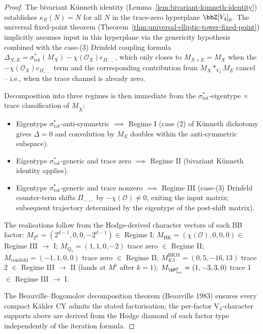 \begin{proof}
The bivariant K\"unneth identity
\textup{(}Lemma~\ref{lem:bivariant-kunneth-identity}\textup{)} establishes
$\kappa_E(N) = N$ for all $N$ in the trace-zero hyperplane
$\bbZ[V_4]_0$. The universal fixed-point theorem
\textup{(}Theorem~\ref{thm:universal-elliptic-tower-fixed-point}\textup{)}
implicitly assumes input in this hyperplane via the genericity hypothesis
combined with the case-(3) Drinfeld coupling formula
$\Delta_{X, E} = \sigma_{\mathrm{tot}}^*(M_X) - \chi(\mathcal{O}_X)
e_{\Pi_{--}}$, which only closes to $M_{X \times E} = M_X$ when the
$-\chi(\mathcal{O}_X) e_{\Pi_{--}}$ term and the corresponding contribution
from $M_X *_{V_4} M_E$ cancel -- i.e., when the trace channel is already
zero.

Decomposition into three regimes is then immediate from the
$\sigma_{\mathrm{tot}}^*$-eigentype $\times$ trace classification of
$M_{\widetilde X}$:
\begin{itemize}
 \item Eigentype $\sigma_{\mathrm{tot}}^*$-anti-symmetric $\implies$ Regime I
 \textup{(}case (2) of K\"unneth dichotomy gives $\Delta = 0$ and
 convolution by $M_E$ doubles within the anti-symmetric
 subspace\textup{).}
 \item Eigentype $\sigma_{\mathrm{tot}}^*$-generic and trace zero $\implies$
 Regime II \textup{(}bivariant K\"unneth identity applies\textup{).}
 \item Eigentype $\sigma_{\mathrm{tot}}^*$-generic and trace nonzero $\implies$
 Regime III \textup{(}case-(3) Drinfeld counter-term shifts $\Pi_{--}$
 by $-\chi(\mathcal{O}) \neq 0$, exiting the input matrix; subsequent
 trajectory determined by the eigentype of the post-shift matrix\textup{).}
\end{itemize}
The realisations follow from the Hodge-derived character vectors of each
BB factor:
$M_{T^d} = (2^{d-1}, 0, 0, -2^{d-1}) \in $ Regime I;
$M_{\mathrm{HK}} = (\chi(\mathcal{O}), 0, 0, 0) \in $ Regime III $\to$ I;
$M_{Q_5} = (1, 1, 0, -2)$ trace zero $\in $ Regime II;
$M_{\mathrm{conifold}} = (-1, 1, 0, 0)$ trace zero $\in $ Regime II;
$M_{K3}^{\mathrm{BKM}} = (0, 5, -16, 13)$ trace 2 $\in $ Regime III $\to $ II
\textup{(}lands at $M^\flat$ after $k = 1$\textup{);}
$M_{\bP^2_{\mathrm{loc}}} = (1, -3, 3, 0)$ trace 1 $\in $ Regime III $\to $ I.

The Beauville--Bogomolov decomposition theorem
\textup{(}Beauville 1983\textup{)} ensures every compact K\"ahler CY admits
the stated factorisation; the per-factor V$_4$-character supports above
are derived from the Hodge diamond of each factor type independently of
the iteration formula.
\end{proof}


